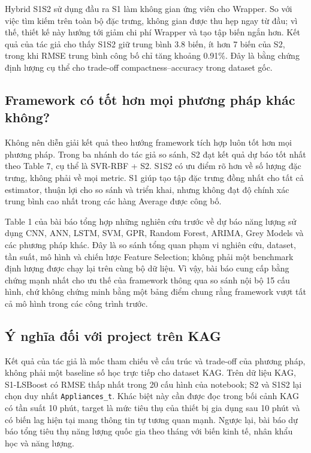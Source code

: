 Hybrid S1S2 sử dụng đầu ra S1 làm không gian ứng viên cho Wrapper. So với việc tìm kiếm trên toàn bộ đặc trưng, không gian được thu hẹp ngay từ đầu; vì thế, thiết kế này hướng tới giảm chi phí Wrapper và tạo tập biến ngắn hơn. Kết quả của tác giả cho thấy S1S2 giữ trung bình 3.8 biến, ít hơn 7 biến của S2, trong khi RMSE trung bình công bố chỉ tăng khoảng 0.91\%. Đây là bằng chứng định lượng cụ thể cho trade-off compactness--accuracy trong dataset gốc.

\subsection{Framework có tốt hơn mọi phương pháp khác không?}

Không nên diễn giải kết quả theo hướng framework tích hợp luôn tốt hơn mọi phương pháp. Trong ba nhánh do tác giả so sánh, S2 đạt kết quả dự báo tốt nhất theo Table 7, cụ thể là SVR-RBF + S2. S1S2 có ưu điểm rõ hơn về số lượng đặc trưng, không phải về mọi metric. S1 giúp tạo tập đặc trưng đồng nhất cho tất cả estimator, thuận lợi cho so sánh và triển khai, nhưng không đạt độ chính xác trung bình cao nhất trong các hàng Average được công bố.

Table 1 của bài báo tổng hợp những nghiên cứu trước về dự báo năng lượng sử dụng CNN, ANN, LSTM, SVM, GPR, Random Forest, ARIMA, Grey Models và các phương pháp khác. Đây là so sánh tổng quan phạm vi nghiên cứu, dataset, tần suất, mô hình và chiến lược Feature Selection; không phải một benchmark định lượng được chạy lại trên cùng bộ dữ liệu. Vì vậy, bài báo cung cấp bằng chứng mạnh nhất cho ưu thế của framework thông qua so sánh nội bộ 15 cấu hình, chứ không chứng minh bằng một bảng điểm chung rằng framework vượt tất cả mô hình trong các công trình trước.

\subsection{Ý nghĩa đối với project trên KAG}

Kết quả của tác giả là mốc tham chiếu về cấu trúc và trade-off của phương pháp, không phải một baseline số học trực tiếp cho dataset KAG. Trên dữ liệu KAG, S1-LSBoost có RMSE thấp nhất trong 20 cấu hình của notebook; S2 và S1S2 lại chọn duy nhất \texttt{Appliances\_t}. Khác biệt này cần được đọc trong bối cảnh KAG có tần suất 10 phút, target là mức tiêu thụ của thiết bị gia dụng sau 10 phút và có biến lag hiện tại mang thông tin tự tương quan mạnh. Ngược lại, bài báo dự báo tổng tiêu thụ năng lượng quốc gia theo tháng với biến kinh tế, nhân khẩu học và năng lượng.

